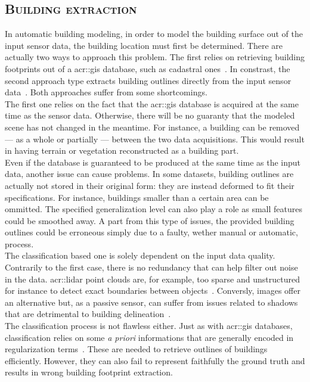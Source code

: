     \subsection{\textsc{Building extraction}}
        \label{subsec::state_of_the_art::building_modeling::building_extraction}
        In automatic building modeling, in order to model the building surface out of the input sensor data, the building location must first be determined.
        There are actually two ways to approach this problem.
        The first relies on retrieving building footprints out of a \gls{acr::gis} database, such as cadastral ones~\parencite{taillandier2004automatic,durupt2006automatic,horna2007building,ledoux2011topologically,biljecki2017generating,biljecki2019raise}.
        In constrast, the second approach type extracts building outlines directly from the input sensor data~\parencite{poullis2009automatic,lafarge2012creating,nguatem2017modeling,zhu2018large}.
        Both approaches suffer from some shortcomings.\\

        The first one relies on the fact that the \gls{acr::gis} database is acquired at the same time as the sensor data.
        Otherwise, there will be no guaranty that the modeled scene has not changed in the meantime.
        For instance, a building can be removed --- as a whole or partially --- between the two data acquisitions.
        This would result in having terrain or vegetation reconstructed as a building part.\\
        Even if the database is guaranteed to be produced at the same time as the input data, another issue can cause problems.
        In some datasets, building outlines are actually not stored in their original form: they are instead deformed to fit their specifications.
        For instance, buildings smaller than a certain area can be ommitted.
        The specified generalization level can also play a role as small features could be smoothed away.
        A part from this type of issues, the provided building outlines could be erroneous simply due to a faulty, wether manual or automatic, process.\\
        
        The classification based one is solely dependent on the input data quality.
        Contrarily to the first case, there is no redundancy that can help filter out noise in the data.
        \Gls{acr::lidar} point clouds are, for example, too sparse and unstructured for instance to detect exact boundaries between objects~\parencite{michelin2012building}.
        Conversly, images offer an alternative but, as a passive sensor, can suffer from issues related to shadows that are detrimental to building delineation~\parencite{adeline2013shadow}.\\
        The classification process is not flawless either.
        Just as with \gls{acr::gis} databases, classification relies on some \textit{a priori} informations that are generally encoded in regularization terms~\parencite{lafarge2008structural,zhu2018large,zeng2018neural}.
        These are needed to retrieve outlines of buildings efficiently.
        However, they can also fail to represent faithfully the ground truth and results in wrong building footprint extraction.

